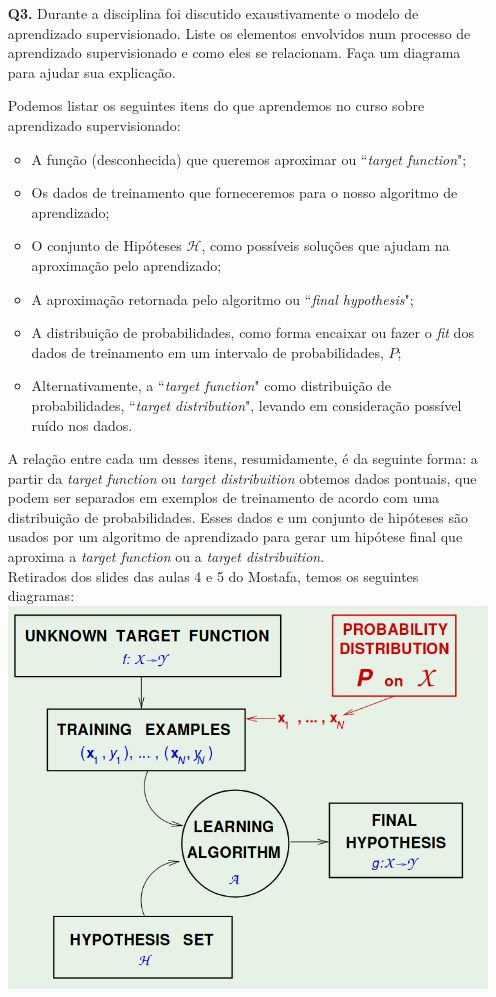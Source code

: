 \documentclass[12pt]{article}
\begin{document}
\begin{enumerate}
\item [\textbf{Q3.}] Durante a disciplina foi discutido exaustivamente o modelo de aprendizado supervisionado. Liste os elementos envolvidos num processo de aprendizado supervisionado e como eles se relacionam. Faça um diagrama para ajudar sua explicação. 
	\begin{addmargin}[1em]{2em}%
		Podemos listar os seguintes itens do que aprendemos no curso sobre aprendizado supervisionado:
			\begin{itemize}
				\item A função (desconhecida) que queremos aproximar ou ``\textit{target function}";
				\item Os dados de treinamento que forneceremos para o nosso algoritmo de aprendizado;
				\item O conjunto de Hipóteses $\mathcal{H}$, como possíveis soluções que ajudam na aproximação pelo aprendizado;
				\item A aproximação retornada pelo algoritmo ou ``\textit{final hypothesis}";
				\item A distribuição de probabilidades, como forma encaixar ou fazer o \textit{fit} dos dados de treinamento em um intervalo de probabilidades, $P$;
				\item Alternativamente, a ``\textit{target function}" como distribuição de probabilidades, ``\textit{target distribution}", levando em consideração possível ruído nos dados.
			\end{itemize}
			A relação entre cada um desses itens, resumidamente, é da seguinte forma: a partir da \textit{target function} ou \textit{target distribuition} obtemos dados pontuais, que podem ser separados em exemplos de treinamento de acordo com uma distribuição de probabilidades. Esses dados e um conjunto de hipóteses são usados por um algoritmo de aprendizado para gerar um hipótese final que aproxima a \textit{target function} ou a \textit{target distribuition}.\\
			Retirados dos slides das aulas 4 e 5 do Mostafa, temos os seguintes diagramas:
		\includegraphics[scale=.3]{"images/SupervisedLearning-a"}

\end{addmargin}
\end{enumerate}
\end{document}
